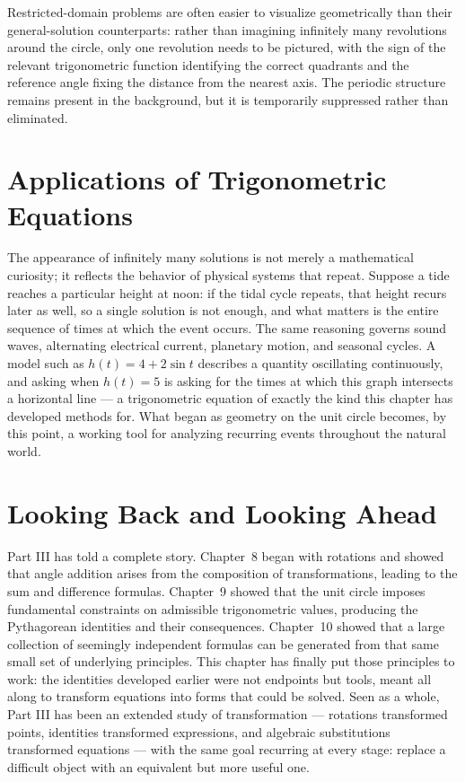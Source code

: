 Restricted-domain problems are often easier to visualize geometrically than
their general-solution counterparts: rather than imagining infinitely many
revolutions around the circle, only one revolution needs to be pictured,
with the sign of the relevant trigonometric function identifying the
correct quadrants and the reference angle fixing the distance from the
nearest axis. The periodic structure remains present in the background,
but it is temporarily suppressed rather than eliminated.

\section{Applications of Trigonometric Equations}

The appearance of infinitely many solutions is not merely a mathematical
curiosity; it reflects the behavior of physical systems that repeat.
Suppose a tide reaches a particular height at noon: if the tidal cycle
repeats, that height recurs later as well, so a single solution is not
enough, and what matters is the entire sequence of times at which the
event occurs. The same reasoning governs sound waves, alternating
electrical current, planetary motion, and seasonal cycles. A model such as
$h(t) = 4 + 2\sin t$ describes a quantity oscillating continuously, and
asking when $h(t) = 5$ is asking for the times at which this graph
intersects a horizontal line --- a trigonometric equation of exactly the
kind this chapter has developed methods for. What began as geometry on the
unit circle becomes, by this point, a working tool for analyzing recurring
events throughout the natural world.

\section{Looking Back and Looking Ahead}

Part III has told a complete story. Chapter~8 began with rotations and
showed that angle addition arises from the composition of transformations,
leading to the sum and difference formulas. Chapter~9 showed that the unit
circle imposes fundamental constraints on admissible trigonometric values,
producing the Pythagorean identities and their consequences. Chapter~10
showed that a large collection of seemingly independent formulas can be
generated from that same small set of underlying principles. This chapter
has finally put those principles to work: the identities developed earlier
were not endpoints but tools, meant all along to transform equations into
forms that could be solved. Seen as a whole, Part III has been an extended
study of transformation --- rotations transformed points, identities
transformed expressions, and algebraic substitutions transformed equations
--- with the same goal recurring at every stage: replace a difficult object
with an equivalent but more useful one.

